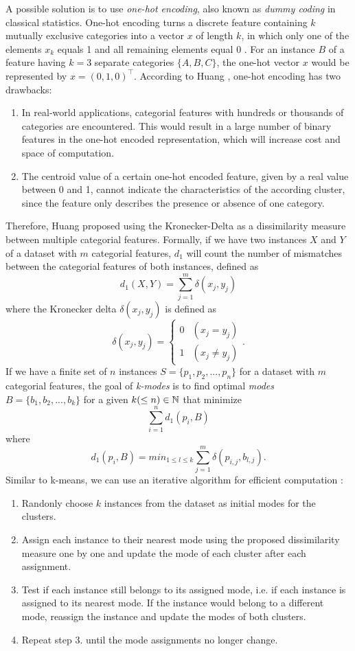 A possible solution is to use \textit{one-hot encoding}, also known as \textit{dummy coding} in classical statistics. One-hot encoding turns a discrete feature containing $k$ mutually exclusive categories into a vector $x$ of length $k$, in which only one of the elements $x_k$ equals 1 and all remaining elements equal 0 \cite{pattern_recognition_machine_learning}. For an instance $B$ of a feature having $k=3$ separate categories $\{A, B, C\}$, the one-hot vector $x$ would be represented by $x = (0, 1, 0)^{\intercal}$. According to Huang \cite{kmodes}, one-hot encoding has two drawbacks:
\begin{enumerate} 
	\item In real-world applications, categorial features with hundreds or thousands of categories are encountered. This would result in a large number of binary features in the one-hot encoded representation, which will increase cost and space of computation.
	\item The centroid value of a certain one-hot encoded feature, given by a real value between 0 and 1, cannot indicate the characteristics of the according cluster, since the feature only describes the presence or absence of one category.
\end{enumerate}
Therefore, Huang \cite{kmodes} proposed using the Kronecker-Delta as a dissimilarity measure between multiple categorial features. Formally, if we have two instances $X$ and $Y$ of a dataset with $m$ categorial features, $d_1$ will count the number of mismatches between the categorial features of both instances, defined as
$$d_1(X, Y) = \sum^m_{j=1} \delta (x_j, y_j)$$
where the Kronecker delta $\delta (x_j, y_j)$ is defined as
$$\delta (x_j, y_j) = 
\begin{cases}
    0 & (x_j = y_j)\\
    1 & (x_j \neq y_j)
\end{cases}.
$$
If we have a finite set of $n$ instances $S=\{p_1, p_2, ..., p_n\}$ for a dataset with $m$ categorial features, the goal of \textit{k-modes} \cite{kmodes} is to find optimal \textit{modes} $B=\{b_1, b_2, ..., b_k\}$ for a given $k (\leq n) \in \mathbb{N}$ that minimize
$$\sum_{i=1}^n  d_1(p_i, B)$$
where
$$d_1(p_i, B) = min_{1 \leq l \leq k} \sum^m_{j=1} \delta (p_{i,j}, b_{l,j}).$$
Similar to k-means, we can use an iterative algorithm for efficient computation \cite{kmodes}:
\begin{enumerate} 
	\item Randonly choose $k$ instances from the dataset as initial modes for the clusters.
	\item Assign each instance to their nearest mode using the proposed dissimilarity measure one by one and update the mode of each cluster after each assignment.
	\item Test if each instance still belongs to its assigned mode, i.e. if each instance is assigned to its nearest mode. If the instance would belong to a different mode, reassign the instance and update the modes of both clusters.
	\item Repeat step 3. until the mode assignments no longer change.
\end{enumerate}

